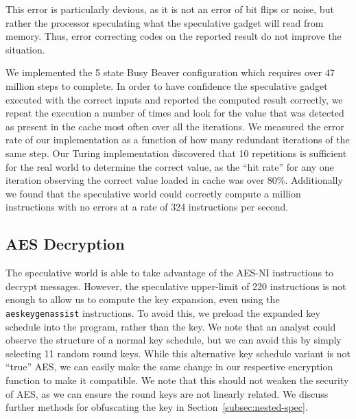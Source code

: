 This error is particularly devious, as it is not an
error of bit flips or noise, but rather the processor speculating what the
speculative gadget will read from memory. Thus, error correcting codes on
the reported result do not improve the situation.


We implemented the 5 state Busy Beaver configuration which requires over 47
million steps to complete. In order to have confidence the speculative gadget
executed with the correct inputs and reported the computed result correctly, we
repeat the execution a number of times and look for the value that was detected
as present in the cache most often over all the iterations. We measured the
error rate of our implementation as a function of how many redundant iterations
of the same step. Our Turing implementation discovered that 10 repetitions is
sufficient for the real world to determine the correct value, as the ``hit
rate'' for any one iteration observing the correct value loaded in cache was
over 80\%. Additionally we found that the speculative world could correctly
compute a million instructions with no errors at a rate of 324 instructions per
second.



\subsection{AES Decryption}
\label{subsec:impl-aes}
The speculative world is able to take advantage of the AES-NI instructions to
decrypt messages. However, the speculative upper-limit of 220 instructions is not
enough to allow us to compute the key expansion, even using the
\texttt{aeskeygenassist} instructions. To avoid this, we preload the expanded
key schedule into the program, rather than the key. We note that an analyst
could observe the structure of a normal key schedule,
but we can avoid this by simply selecting 11 random round keys.
While this alternative key schedule variant is not ``true'' AES, we can easily
make the same change in our respective encryption function to make it compatible.
We note that
this should not weaken the security of AES, as we can ensure the round keys are
not linearly related.
We discuss further methods for obfuscating
the key in Section~\ref{subsec:nested-spec}.


